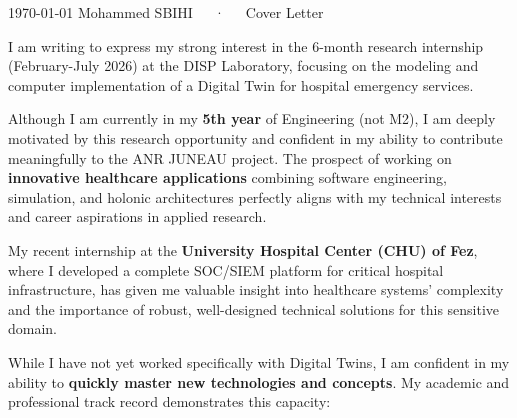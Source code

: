 \documentclass[11pt, a4paper]{awesome-cv}
\begin{document}
\makecvheader[R]

\makecvfooter
{\today}
{Mohammed SBIHI~~~·~~~Cover Letter}
{}

\makelettertitle

\begin{cvletter}


    I am writing to express my strong interest in the 6-month research internship (February-July 2026) at the DISP Laboratory, focusing on the modeling and computer implementation of a Digital Twin for hospital emergency services.

    Although I am currently in my \textbf{5th year} of Engineering (not M2), I am deeply motivated by this research opportunity and confident in my ability to contribute meaningfully to the ANR JUNEAU project. The prospect of working on \textbf{innovative healthcare applications} combining software engineering, simulation, and holonic architectures perfectly aligns with my technical interests and career aspirations in applied research.

    My recent internship at the \textbf{University Hospital Center (CHU) of Fez}, where I developed a complete SOC/SIEM platform for critical hospital infrastructure, has given me valuable insight into healthcare systems' complexity and the importance of robust, well-designed technical solutions for this sensitive domain.


    While I have not yet worked specifically with Digital Twins, I am confident in my ability to \textbf{quickly master new technologies and concepts}. My academic and professional track record demonstrates this capacity:


\end{cvletter}
\end{document}
